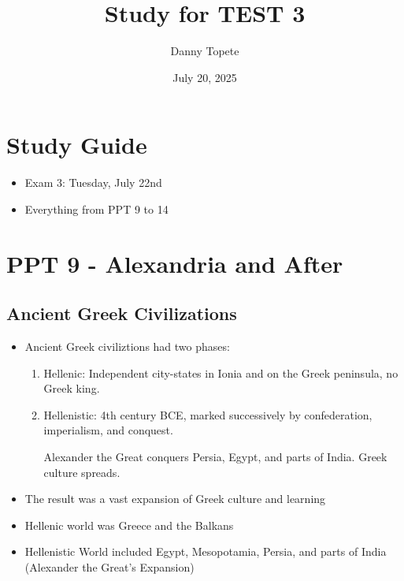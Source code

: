 \documentclass{article}
\title{Study for TEST 3}
\author{Danny Topete}
\date{July 20, 2025}
\begin{document}
  \maketitle

  \section*{Study Guide}
  \begin{itemize}
    \item Exam 3: Tuesday, July 22nd
    \item Everything from PPT 9 to 14
  \end{itemize}

\section{PPT 9 - Alexandria and After}

\subsection{Ancient Greek Civilizations}
\begin{itemize}
  \item Ancient Greek civiliztions had two phases:
    \begin{enumerate}
      \item Hellenic:
        Independent city-states in Ionia and on the
        Greek peninsula, no Greek king.
      \item Hellenistic:
        4th century BCE, marked successively
        by confederation, imperialism, and conquest.

        Alexander the Great conquers Persia, Egypt,
        and parts of India. Greek culture spreads.
    \end{enumerate}
  \item The result was a vast expansion of Greek culture and learning
  \item Hellenic world was Greece and the Balkans
  \item Hellenistic World included Egypt, Mesopotamia, Persia, and parts of India
    (Alexander the Great's Expansion)
\end{itemize}
\end{document}
